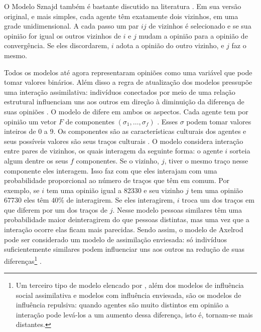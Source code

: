   O Modelo Sznajd também é bastante discutido na literatura
  \cite{sznajd2000opinion, sirbu2017opinion,castellano2012social}. Em sua versão
  original, e mais simples, cada agente têm exatamente dois vizinhos, em uma
  grade unidimensional. A cada passo um par $ij$ de vizinhos é selecionado e se
  sua opinião for igual os outros vizinhos de \(i\) e \(j\) mudam a opinião para
  a opinião de convergência. Se eles discordarem, \(i\) adota a opinião do outro
  vizinho, e \(j\) faz o mesmo.

  Todos os modelos até agora representaram opiniões como uma variável que pode
  tomar valores binários. Além disso a regra de atualização dos modelos
  pressupõe uma interação assimilativa: indivíduos conectados por meio de uma
  relação estrutural influenciam uns aos outros em direção à diminuição da
  diferença de suas opiniões \cite{flache2017}. O modelo de
   difere em ambos os aspectos. Cada agente
  tem por opinião um vetor $F$ de componentes $(\sigma_1 , \ldots, \sigma_f)$
  \cite{klemm2003role}. Esses $\sigma$ podem tomar valores inteiros de 0 a 9. Os
  componentes são as características culturais dos agentes e seus possíveis
  valores são seus traços culturais \cite{gomes2014}. O modelo considera
  interação entre pares de vizinhos, os quais interagem da seguinte forma: o
  agente \(i\) sorteia algum dentre os seus \(f\) componentes. Se o vizinho,
  \(j\), tiver o mesmo traço nesse componente eles interagem. Isso faz com que
  eles interajam com uma probabilidade proporcional ao número de traços que têm
  em comum. Por exemplo, se \(i\) tem uma opinião igual a 82330 e seu vizinho
  \(j\) tem uma opinião 67730 eles têm \(40 \%\) de interagirem. Se eles
  interagirem, \(i\) troca um dos traços em que diferem por um dos traços de
  \(j\)\cite{axelrod1997dissemination}. Nesse modelo pessoas similares têm uma
  probabilidade maior deinteragirem do que pessoas distintas, mas uma vez que a
  interação ocorre elas ficam mais parecidas. Sendo assim, o modelo de Axelrod
  pode ser considerado um modelo de assimilação enviesada: só indivíduos
  suficientemente similares podem influenciar uns aos outros na redução de suas
  diferenças\footnote{Um terceiro tipo de modelo elencado por
    , além dos modelos de influência social assimilativa
    e modelos com influência enviesada, são os modelos de influência repulsiva:
    quando agentes são muito distintos em opinião a interação pode levá-los a um
    aumento dessa diferença, isto é, tornam-se mais distantes.}
  \cite{flache2017}.


